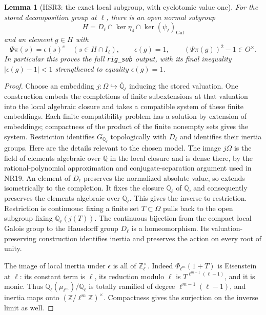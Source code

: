 \documentclass[11pt,a4paper]{article}
\numberwithin{equation}{section}
\newtheorem{lemma}[theorem]{Lemma}
\theoremstyle{remark}\newtheorem{remark}[theorem]{Remark}
\begin{document}
\begin{lemma}[HSR3: the exact local subgroup, with cyclotomic value one]
\label{claim:HSR3}
For the stored decomposition group at $\ell$, there is an open
normal subgroup
\[
 H=D_\ell\cap\ker\eta_4\cap\ker(\psi_\ell)_{\mathrm{Gal}}
 \tag{HSR.15}
\]
and an element $g\in H$ with
\[
 \Psi\pi(s)=\epsilon(s)^e\quad(s\in H\cap I_\ell),\qquad
 \epsilon(g)=1,\qquad (\Psi\pi(g))^2-1\in O^\times.
 \tag{HSR.16}
\]
In particular this proves the full \texttt{rig\_\allowbreak sub} output, with
its final inequality $|\epsilon(g)-1|<1$ strengthened to equality
$\epsilon(g)=1$.
\end{lemma}
\begin{proof}
Choose an embedding $j:\Omega\hookrightarrow
\overline{\mathbb Q}_\ell$ inducing the stored valuation.  One
construction embeds the completions of finite subextensions at
that valuation into the local algebraic closure and takes a
compatible system of these finite embeddings.  Each finite
compatibility problem has a solution by extension of embeddings;
compactness of the product of the finite nonempty sets gives the
system.  Restriction identifies $G_{\mathbb Q_\ell}$
topologically with $D_\ell$ and identifies their inertia groups.
Here are the details relevant to the chosen model.  The image
$j\Omega$ is the field of elements algebraic over $\mathbb Q$
in the local closure and is dense there, by the rational-polynomial
approximation and conjugate-separation argument used in NR19.
An element of $D_\ell$ preserves the normalized absolute value,
so extends isometrically to the completion.  It fixes the closure
$\mathbb Q_\ell$ of $\mathbb Q$, and consequently preserves
the elements algebraic over $\mathbb Q_\ell$.  This gives the
inverse to restriction.  Restriction is continuous: fixing a finite
set $T\subset\Omega$ pulls back to the open subgroup fixing
$\mathbb Q_\ell(j(T))$.  The continuous bijection from the compact
local Galois group to the Hausdorff group $D_\ell$ is a
homeomorphism.  Its valuation-preserving construction identifies
inertia and preserves the action on every root of unity.

The image of local inertia under $\epsilon$ is all of
$\mathbb Z_\ell^\times$.  Indeed
$\Phi_{\ell^m}(1+T)$ is Eisenstein at $\ell$: its constant term
is $\ell$, its reduction modulo $\ell$ is
$T^{\ell^{m-1}(\ell-1)}$, and it is monic.  Thus
$\mathbb Q_\ell(\mu_{\ell^m})/\mathbb Q_\ell$ is totally
ramified of degree $\ell^{m-1}(\ell-1)$, and inertia maps onto
$(\mathbb Z/\ell^m\mathbb Z)^\times$.  Compactness gives the
surjection on the inverse limit as well.


\end{proof}
\end{document}
